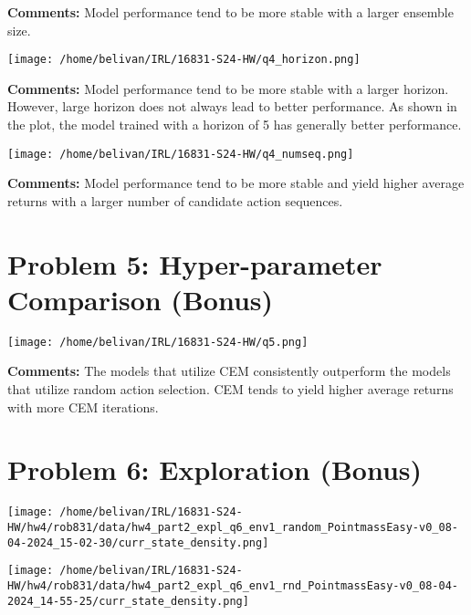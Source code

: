 \documentclass{article}
\begin{document}
\textbf{Comments:} Model performance tend to be more stable with a larger ensemble size. 

\begin{answer}[title=Plot,height=9.5cm,width=\linewidth]
\centering
\texttt{[image: /home/belivan/IRL/16831-S24-HW/q4\_horizon.png]}
\end{answer}

\textbf{Comments:} Model performance tend to be more stable with a larger horizon.
However, large horizon does not always lead to better performance.
As shown in the plot, the model trained with a horizon of 5 has generally better performance.

\begin{answer}[title=Plot,height=9.5cm,width=\linewidth]
\centering
\texttt{[image: /home/belivan/IRL/16831-S24-HW/q4\_numseq.png]}
\end{answer}

\textbf{Comments:} Model performance tend to be more stable and yield higher 
average returns with a larger number of candidate action sequences.


\section{Problem 5: Hyper-parameter Comparison (Bonus)}
\begin{answer}[title=Plot,height=9.5cm,width=\linewidth]
\centering
\texttt{[image: /home/belivan/IRL/16831-S24-HW/q5.png]}
\end{answer}

\textbf{Comments:} The models that utilize CEM consistently outperform the models that utilize random action selection.
CEM tends to yield higher average returns with more CEM iterations.


\section{Problem 6: Exploration (Bonus)}
\begin{answer}[title=Density Plot Pointmass Easy Random,height=9.5cm,width=\linewidth]
\centering
\texttt{[image: /home/belivan/IRL/16831-S24-HW/hw4/rob831/data/hw4\_part2\_expl\_q6\_env1\_random\_PointmassEasy-v0\_08-04-2024\_15-02-30/curr\_state\_density.png]}
\end{answer}

\begin{answer}[title=Density Plot Pointmass Easy RND,height=9.5cm,width=\linewidth]
\centering
\texttt{[image: /home/belivan/IRL/16831-S24-HW/hw4/rob831/data/hw4\_part2\_expl\_q6\_env1\_rnd\_PointmassEasy-v0\_08-04-2024\_14-55-25/curr\_state\_density.png]}
\end{answer}
\end{document}
